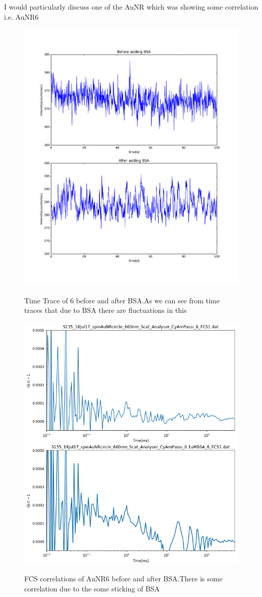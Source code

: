 \documentclass[twoside,single]{lion-msc}
\begin{document}
I would particularly discuss one of the AuNR which was showing some correlation i.e. AuNR6
\begin{figure}[h]
\includegraphics[width=.8\textwidth,center]{11}
\begin{center}
Time Trace of 6 before and after BSA.As we can see from time traces that due to BSA there are fluctuations in this
\end{center}
\end{figure}
\begin{figure}[h]
\includegraphics[width=.8\textwidth,center]{12}
\begin{center}
FCS correlations of AuNR6 before and after BSA.There is some correlation due to the some sticking of BSA
\end{center}
\end{figure}
\end{document}

